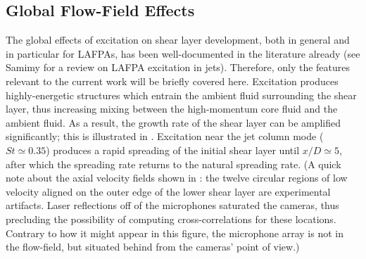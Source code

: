 \subsection{Global Flow-Field Effects}
The global effects of excitation on shear layer development, both in general and in particular for LAFPAs, has been well-documented in the literature already (see Samimy \etal \citep{Samimy2012} for a review on LAFPA excitation in jets).
Therefore, only the features relevant to the current work will be briefly covered here.
Excitation produces highly-energetic structures which entrain the ambient fluid surrounding the shear layer, thus increasing mixing between the high-momentum core fluid and the ambient fluid.
As a result, the growth rate of the shear layer can be amplified significantly; this is illustrated in .
Excitation near the jet column mode ($St \simeq 0.35$) produces a rapid spreading of the initial shear layer until $x/D \simeq 5$, after which the spreading rate returns to the natural spreading rate.
(A quick note about the axial velocity fields shown in : the twelve circular regions of low velocity aligned on the outer edge of the lower shear layer are experimental artifacts. Laser reflections off of the microphones saturated the cameras, thus precluding the possibility of computing cross-correlations for these locations. Contrary to how it might appear in this figure, the microphone array is not in the flow-field, but situated behind from the cameras' point of view.)
